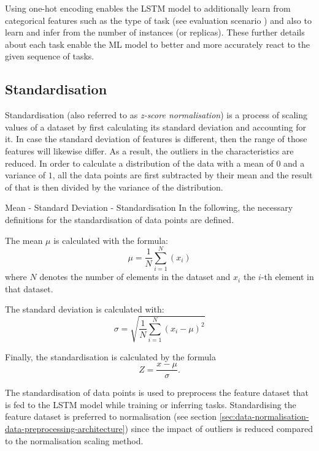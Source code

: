   Using one-hot encoding enables the LSTM model to additionally learn from categorical features such as the type of task (see evaluation scenario ) and also to learn and infer from the number of instances (or  replicas). 
  These further details about each task enable the ML model to better and more accurately react to the given sequence of tasks.

  \subsection{Standardisation}
  \label{sec:data-standardisation-data-preprocessing-architecture}
    Standardisation (also referred to as \emph{z-score normalisation}) is a process of scaling values of a dataset by first calculating its standard deviation and accounting for it. In case the standard deviation of features is different, then the range of those features will likewise differ. As a result, the outliers in the characteristics are reduced.
    In order to calculate a distribution of the data with a mean of $0$ and a variance of $1$, all the data points are first subtracted by their mean and the result of that is then divided by the variance of the distribution.

    \begin{pabox}{Mean - Standard Deviation - Standardisation}
      \label{def:standardisation}
      In the following, the necessary definitions for the standardisation of data points are defined.

      The mean $\mu$ is calculated with the formula:
      $$\mu = \frac{1}{N}\sum_{i = 1}^{N}\left(x_i\right)$$
      where $N$ denotes the number of elements in the dataset and $x_i$ the $i$-th element in that dataset.

      The standard deviation is calculated with:
      $$\sigma = \sqrt{\frac{1}{N} \sum_{i = 1}^{N}\left(x_i - \mu\right)^2}$$
    
      Finally, the standardisation is calculated by the formula $$Z = \frac{x - \mu}{\sigma}.$$

    \end{pabox}
    The standardisation of data points is used to preprocess the feature dataset that is fed to the LSTM model while training or inferring tasks. Standardising the feature dataset is preferred to normalisation (see section \ref{sec:data-normalisation-data-preprocessing-architecture}) since the impact of outliers is reduced compared to the normalisation scaling method.

